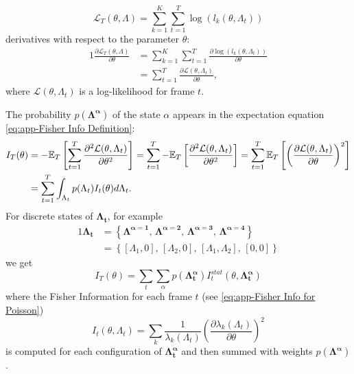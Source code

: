 \begin{equation}
	\mathcal{L}_T(\theta,\Lambda)=\sum_{k=1}^K\sum_{t=1}^T\log\left(l_k(\theta,\Lambda_t)\right)
\end{equation}
%
derivatives with respect to the parameter $\theta$:
%
\begin{alignat*}{1}
	\frac{\partial\mathcal{L}_T(\theta,\Lambda)}{\partial \theta}
	&=\sum_{k=1}^K\sum_{t=1}^T\frac{\partial\log\left(l_k(\theta,\Lambda_t)\right)}{\partial \theta}\\
	&=\sum_{t=1}^T\frac{\partial\mathcal{L}(\theta,\Lambda_t)}{\partial \theta}, 
\end{alignat*}
%
where $\mathcal{L}(\theta,\Lambda_t)$ is a log-likelihood for frame $t$.

The probability $p(\bm{\Lambda^\alpha})$ of the state $\alpha$ appears in the expectation equation \autoref{eq:app-Fisher Info Definition}:
%
\begin{alignat*}{1}
	I_T(\theta) & =-\mathbb{E}_T\left[\sum_{t=1}^T\frac{\partial^2\mathcal{L}(\theta,\Lambda_t)}{\partial \theta^2}\right]=\sum_{t=1}^T-\mathbb{E}_T\left[\frac{\partial^2\mathcal{L}(\theta,\Lambda_t)}{\partial \theta^2}\right]=\sum_{t=1}^T\mathbb{E}_T\left[\left(\frac{\partial\mathcal{L}(\theta,\Lambda_t)}{\partial \theta}\right)^2\right]\\
	& =\sum_{t=1}^T\int_{\Lambda_t}p(\Lambda_t)I_t(\theta)d\Lambda_t.
\end{alignat*}
%
For discrete states of $\bm{\Lambda_t}$, for example  
%
\begin{alignat*}{1}
	\bm{\Lambda_t}
	&=\left\{\bm{\Lambda^{\alpha=1}},\,\bm{\Lambda^{\alpha=2}},\,\bm{\Lambda^{\alpha=3}},\,\bm{\Lambda^{\alpha=4}}\right\}\\
	&=\left\{[\Lambda_1,0],\,[\Lambda_2,0],\,[\Lambda_1,\Lambda_2],\,[0,0]\right\}
\end{alignat*}	
% 
we get
\begin{equation}
	I_T(\theta)=\sum_t\sum_{\alpha}p(\bm{\Lambda^{\alpha}_t})I^{stat}_t(\theta,\bm{\Lambda^{\alpha}_{t}})
\end{equation}
%
where the Fisher Information for each frame $t$ (see \autoref{eq:app-Fisher Info for Poisson})
%
\begin{equation}
	I_t(\theta,\Lambda_t)=\sum_k\frac{1}{\lambda_k(\Lambda_t)}\left(\frac{\partial\lambda_k(\Lambda_t)}{\partial \theta}\right)^2
\end{equation}
%
 is computed for each configuration of $\bm{\Lambda_t^\alpha}$ and then summed with weights $p(\bm{\Lambda^\alpha})$. 

